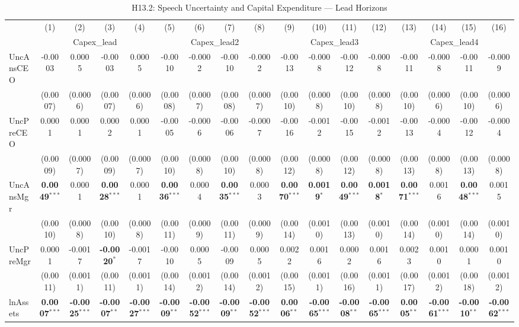 \documentclass[11pt,a4paper]{article}
\begin{document}
\begin{table}[htbp]
\centering
\caption{H13.2: Speech Uncertainty and Capital Expenditure --- Lead Horizons}
\label{tab:h13_2}
\scriptsize
\begin{tabular}{lcccccccccccccccc}
\toprule
 & (1) & (2) & (3) & (4) & (5) & (6) & (7) & (8) & (9) & (10) & (11) & (12) & (13) & (14) & (15) & (16) \\
 & \multicolumn{4}{c}{Capex\_lead} & \multicolumn{4}{c}{Capex\_lead2} & \multicolumn{4}{c}{Capex\_lead3} & \multicolumn{4}{c}{Capex\_lead4} \\
\cmidrule(lr){2-5} \cmidrule(lr){6-9} \cmidrule(lr){10-13} \cmidrule(lr){14-17}
\midrule
UncAnsCEO & -0.0003 & 0.0005 & -0.0003 & 0.0005 & -0.0010 & -0.0002 & -0.0010 & -0.0002 & -0.0013 & -0.0008 & -0.0012 & -0.0008 & -0.0011 & -0.0008 & -0.0011 & -0.0009 \\
 & (0.0007) & (0.0006) & (0.0007) & (0.0006) & (0.0008) & (0.0007) & (0.0008) & (0.0007) & (0.0010) & (0.0008) & (0.0010) & (0.0008) & (0.0010) & (0.0006) & (0.0010) & (0.0006) \\
UncPreCEO & 0.0001 & 0.0001 & 0.0002 & 0.0001 & -0.0005 & -0.0006 & -0.0006 & -0.0007 & -0.0016 & -0.0012 & -0.0015 & -0.0012 & -0.0013 & -0.0004 & -0.0012 & -0.0004 \\
 & (0.0009) & (0.0007) & (0.0009) & (0.0007) & (0.0010) & (0.0008) & (0.0010) & (0.0008) & (0.0012) & (0.0008) & (0.0012) & (0.0008) & (0.0013) & (0.0008) & (0.0013) & (0.0008) \\
UncAnsMgr & \textbf{0.0049}$^{***}$ & 0.0001 & \textbf{0.0028}$^{***}$ & 0.0001 & \textbf{0.0036}$^{***}$ & 0.0004 & \textbf{0.0035}$^{***}$ & 0.0003 & \textbf{0.0070}$^{***}$ & \textbf{0.0019}$^{*}$ & \textbf{0.0049}$^{***}$ & \textbf{0.0018}$^{*}$ & \textbf{0.0071}$^{***}$ & 0.0016 & \textbf{0.0048}$^{***}$ & 0.0015 \\
 & (0.0010) & (0.0008) & (0.0010) & (0.0008) & (0.0011) & (0.0009) & (0.0011) & (0.0009) & (0.0014) & (0.0010) & (0.0013) & (0.0010) & (0.0014) & (0.0010) & (0.0014) & (0.0010) \\
UncPreMgr & 0.0001 & -0.0017 & \textbf{-0.0020}$^{*}$ & -0.0017 & -0.0010 & 0.0005 & -0.0009 & 0.0005 & 0.0022 & 0.0016 & 0.0002 & 0.0016 & 0.0023 & 0.0010 & 0.0001 & 0.0010 \\
 & (0.0011) & (0.0011) & (0.0011) & (0.0011) & (0.0014) & (0.0012) & (0.0014) & (0.0012) & (0.0015) & (0.0011) & (0.0016) & (0.0011) & (0.0017) & (0.0012) & (0.0018) & (0.0012) \\
\midrule
lnAssets & \textbf{0.0007}$^{***}$ & \textbf{-0.0025}$^{***}$ & \textbf{-0.0007}$^{**}$ & \textbf{-0.0027}$^{***}$ & \textbf{-0.0009}$^{**}$ & \textbf{-0.0052}$^{***}$ & \textbf{-0.0009}$^{**}$ & \textbf{-0.0052}$^{***}$ & \textbf{0.0006}$^{**}$ & \textbf{-0.0065}$^{***}$ & \textbf{-0.0008}$^{**}$ & \textbf{-0.0065}$^{***}$ & \textbf{0.0005}$^{**}$ & \textbf{-0.0061}$^{***}$ & \textbf{-0.0010}$^{**}$ & \textbf{-0.0062}$^{***}$ \\

\end{tabular}
\end{table}
\end{document}
